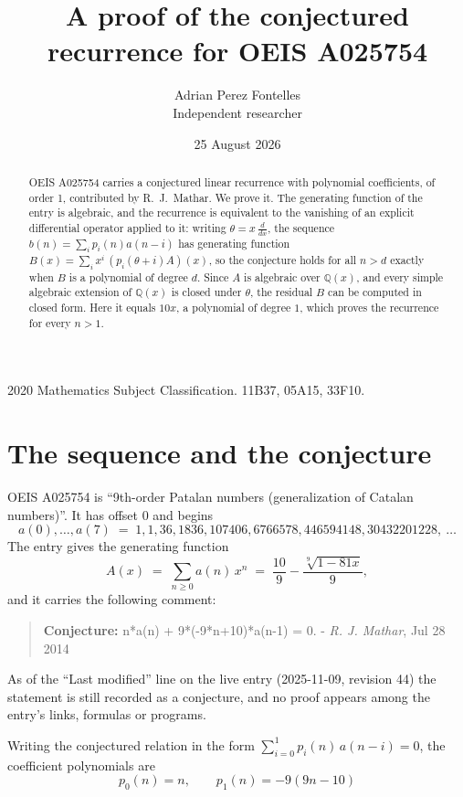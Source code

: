 \documentclass[11pt,a4paper]{article}
\title{A proof of the conjectured recurrence for OEIS A025754}
\author{Adrian Perez Fontelles\\ \small Independent researcher}
\date{25 August 2026}
\theoremstyle{plain}
\theoremstyle{definition}
\begin{document}
\maketitle

\begin{abstract}
OEIS A025754 carries a conjectured linear recurrence with polynomial coefficients, of
order 1, contributed by R.~J.~Mathar. We prove it. The generating function of the
entry is algebraic, and the recurrence is equivalent to the vanishing of an explicit
differential operator applied to it: writing $\theta=x\,\frac{d}{dx}$, the sequence
$b(n)=\sum_{i}p_{i}(n)a(n-i)$ has generating function
$B(x)=\sum_{i}x^{i}\,(p_{i}(\theta+i)A)(x)$, so the conjecture holds for all $n>d$ exactly
when $B$ is a polynomial of degree $d$. Since $A$ is algebraic over $\mathbb{Q}(x)$, and every simple
algebraic extension of $\mathbb{Q}(x)$ is closed under $\theta$, the residual $B$ can be
computed in closed form. Here it equals $10 x$, a polynomial of degree $1$, which proves
the recurrence for every $n>1$.
\end{abstract}

\noindent\small 2020 Mathematics Subject Classification. 11B37, 05A15, 33F10.\normalsize

\section{The sequence and the conjecture}

OEIS A025754 is ``9th-order Patalan numbers (generalization of Catalan numbers)''. It has offset $0$ and begins
\[
a(0),\dots,a(7)\;=\;1, 1, 36, 1836, 107406, 6766578, 446594148, 30432201228,\ \dots
\]
The entry gives the generating function
\begin{equation}\label{eq:gf}
A(x)\;=\;\sum_{n\ge 0} a(n)\,x^{n}\;=\;\frac{10}{9} - \frac{\sqrt[9]{1 - 81 x}}{9} ,
\end{equation}
and it carries the following comment:
\begin{quote}\small
\textbf{Conjecture:} n*a(n) + 9*(-9*n+10)*a(n-1) = 0. - \emph{R. J. Mathar}, Jul 28 2014
\end{quote}
As of the ``Last modified'' line on the live entry (2025-11-09, revision 44) the
statement is still recorded as a conjecture, and no proof appears among the entry's links,
formulas or programs.

Writing the conjectured relation in the form $\sum_{i=0}^{1}p_{i}(n)\,a(n-i)=0$,
the coefficient polynomials are
\[
p_{0}(n)=n,\qquad p_{1}(n)=- 9 \left(9 n - 10\right)
\]
\end{document}
